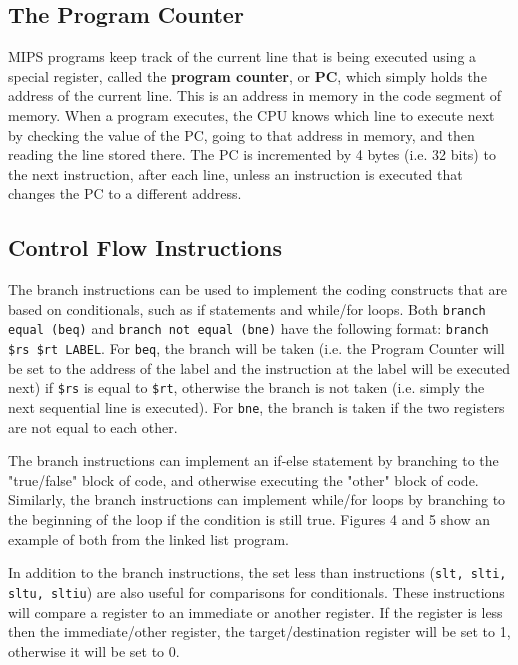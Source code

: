 \documentclass{article}
\begin{document}
\subsection{The Program Counter}
MIPS programs keep track of the current line that is being executed using a special register, called the \textbf{program counter}, or \textbf{PC}, which simply holds the address of the current line. This is an address in memory in the code segment of memory. When a program executes, the CPU knows which line to execute next by checking the value of the PC, going to that address in memory, and then reading the line stored there. The PC is incremented by 4 bytes (i.e. 32 bits) to the next instruction, after each line, unless an instruction is executed that changes the PC to a different address.

\subsection{Control Flow Instructions}
The branch instructions can be used to implement the coding constructs that are based on conditionals, such as if statements and while/for loops. Both \texttt{branch equal (beq)} and \texttt{branch not equal (bne)} have the following format: \texttt{branch \$rs \$rt LABEL}. For \texttt{beq}, the branch will be taken (i.e. the Program Counter will be set to the address of the label and the instruction at the label will be executed next) if \texttt{\$rs} is equal to \texttt{\$rt}, otherwise the branch is not taken (i.e. simply the next sequential line is executed). For \texttt{bne}, the branch is taken if the two registers are not equal to each other. 

The branch instructions can implement an if-else statement by branching to the "true/false" block of code, and otherwise executing the "other" block of code. Similarly, the branch instructions can implement while/for loops by branching to the beginning of the loop if the condition is still true. Figures 4 and 5 show an example of both from the linked list program.

In addition to the branch instructions, the set less than instructions (\texttt{slt, slti, sltu, sltiu}) are also useful for comparisons for conditionals. These instructions will compare a register to an immediate or another register. If the register is less then the immediate/other register, the target/destination register will be set to 1, otherwise it will be set to 0.
\end{document}
